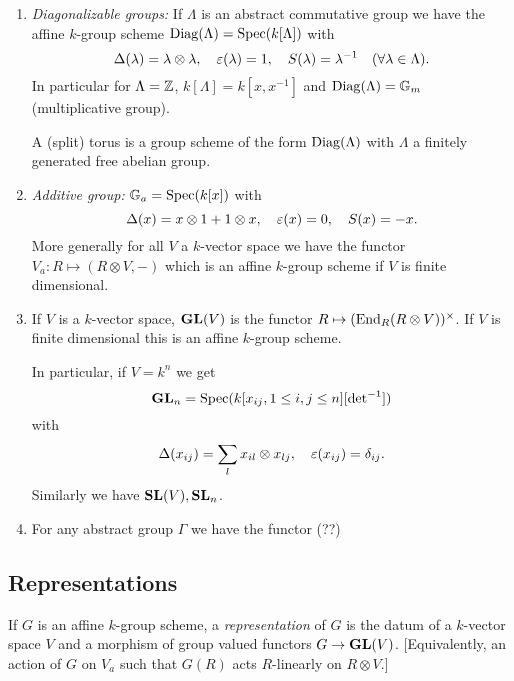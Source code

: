 \begin{example}
	\begin{enumerate}[(1)]
		\item \emph{Diagonalizable groups:} If $\Lambda$ is an abstract commutative group we have the affine $k$-group scheme $\operatorname{Diag}(\Lambda)=\operatorname{Spec}(k[\Lambda])$ with
			\[
			\Delta(\lambda) = \lambda \otimes \lambda,\quad \varepsilon(\lambda)=1,\quad S(\lambda)=\lambda^{-1}\quad (\forall \lambda\in \Lambda).
			\] 
			In particular for $\Lambda=\mathbb Z$, $k[\Lambda]=k[x,x^{-1}]$ and $\operatorname{Diag}(\Lambda)=\mathbb{G}_m$ (multiplicative group).

			A (split) torus is a group scheme of the form $\operatorname{Diag}(\Lambda)$ with $\Lambda$ a finitely generated free abelian group.
		\item \emph{Additive group:} $\mathbb{G}_a=\operatorname{Spec}(k[x])$ with
			\[
			\Delta(x) = x\otimes 1 + 1\otimes x,\quad \varepsilon(x)=0,\quad S(x)=-x.
			\]
			More generally for all $V$ a $k$-vector space we have the functor $V_{a}:R\mapsto (R\otimes V,-)$ which is an affine $k$-group scheme if $V$ is finite dimensional.
		\item If $V$ is a $k$-vector space, $\mathbf{GL}(V)$ is the functor $R\mapsto (\End_R(R\otimes V))^{\times}$. If $V$ is finite dimensional this is an affine $k$-group scheme.

			In particular, if $V=k^{n}$ we get 
			\[
				\mathbf{GL}_n = \operatorname{Spec}(k[x_{ij},1\le i,j\le n][\operatorname{det}^{-1}])
			\] 
			with
			\[
			\Delta(x_{ij}) = \sum_l x_{il}\otimes x_{lj},\quad \varepsilon(x_{ij}) = \delta_{ij}
			.\] 
			Similarly we have $\mathbf{SL}(V), \mathbf{SL}_n$.
		\item For any abstract group $\Gamma$ we have the functor (??)
	\end{enumerate}
\end{example}

\subsection{Representations}

If $G$ is an affine $k$-group scheme, a \emph{representation} of $G$ is the datum of a $k$-vector space $V$ and a morphism of group valued functors $G\to \GL(V)$. [Equivalently, an action of $G$ on $V_{a}$ such that $G(R)$ acts $R$-linearly on $R\otimes V$.]

